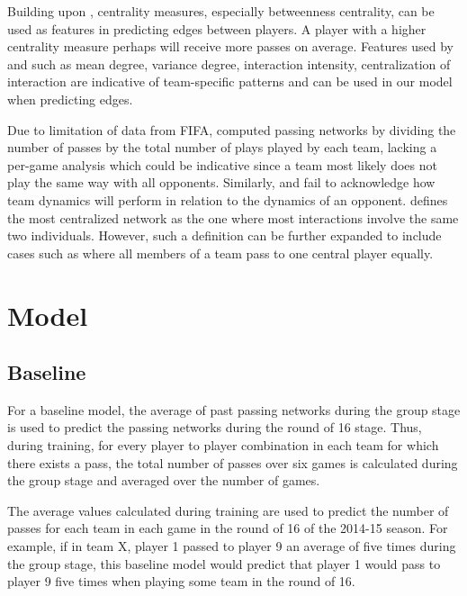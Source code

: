 \documentclass[11pt,letterpaper]{article}
\begin{document}
Building upon \cite{Pena:12}, centrality measures, especially betweenness centrality, can be used as features in predicting edges between players. A player with a higher centrality measure perhaps will receive more passes on average.  Features used by \cite{Cintia:15} and \cite{Grund:12} such as mean degree, variance degree, interaction intensity, centralization of interaction are indicative of team-specific patterns and can be used in our model when predicting edges. 

Due to limitation of data from FIFA, \cite{Pena:12} computed passing networks by dividing the number of passes by the total number of plays played by each team, lacking a per-game analysis which could be indicative since a team most likely does not play the same way with all opponents. Similarly, \cite{Cintia:15} and \cite{Grund:12} fail to acknowledge how team dynamics will perform in relation to the dynamics of an opponent. \cite{Grund:12} defines the most centralized network as the one where most interactions involve the same two individuals. However, such a definition can be further expanded to include cases such as where all members of a team pass to one central player equally.

\section{Model}


\subsection{Baseline}

For a baseline model, the average of past passing networks during the group stage is used to predict the passing networks during the round of 16 stage. Thus, during training, for every player to player combination in each team for which there exists a pass, the total number of passes over six games is calculated during the group stage and averaged over the number of games. 

The average values calculated during training are used to predict the number of passes for each team in each game in the round of 16 of the 2014-15 season. For example, if in team X, player 1 passed to player 9 an average of five times during the group stage, this baseline model would predict that player 1 would pass to player 9 five times when playing some team in the round of 16.
\end{document}
